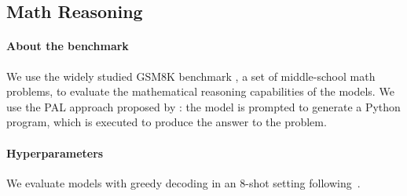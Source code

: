\documentclass[10pt]{article} %
\begin{document}





\subsection{Math Reasoning}
\label{gsm8k-eval}

\paragraph{About the benchmark}
We use the widely studied GSM8K benchmark \citep{cobbe2021gsm8k}, a set of middle-school math problems, to evaluate the mathematical reasoning capabilities of the models. We use the PAL approach proposed by \citet{gao2023pal}: the model is prompted to generate a Python program, which is executed to produce the answer to the problem.

\paragraph{Hyperparameters}
We evaluate models with greedy decoding in an 8-shot setting following~\citet{palm}.
\end{document}
